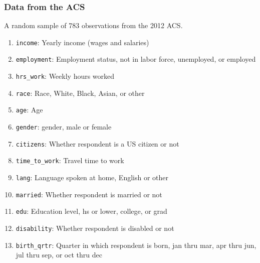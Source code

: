 \documentclass[11pt,containsverbatim,handout,xcolor=xelatex,dvipsnames,table]{beamer}
\begin{document}

\begin{frame}
\frametitle{Data from the ACS}

A random sample of 783 observations from the 2012 ACS.

{\scriptsize
\begin{enumerate}
\item \texttt{income}: Yearly income (wages and salaries)
\item \texttt{employment}: Employment status, not in labor force, unemployed, or employed
\item \texttt{hrs\_work}: Weekly hours worked
\item \texttt{race}: Race, White, Black, Asian, or other
\item \texttt{age}: Age
\item \texttt{gender}: gender, male or female
\item \texttt{citizens}: Whether respondent is a US citizen or not
\item \texttt{time\_to\_work}: Travel time to work
\item \texttt{lang}: Language spoken at home, English or other
\item \texttt{married}: Whether respondent is married or not
\item \texttt{edu}: Education level, hs or lower, college, or grad
\item \texttt{disability}: Whether respondent is disabled or not
\item \texttt{birth\_qrtr}: Quarter in which respondent is born, jan thru mar, apr thru jun, jul thru sep, or oct thru dec 
\end{enumerate}
}

\end{frame}

\end{document}

